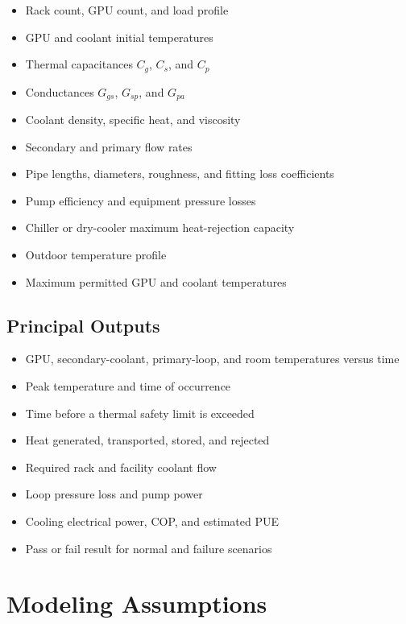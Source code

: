 \documentclass[11pt]{article}
\begin{document}
\begin{itemize}[leftmargin=2em]
    \item Rack count, GPU count, and load profile
    \item GPU and coolant initial temperatures
    \item Thermal capacitances \(C_g\), \(C_s\), and \(C_p\)
    \item Conductances \(G_{gs}\), \(G_{sp}\), and \(G_{pa}\)
    \item Coolant density, specific heat, and viscosity
    \item Secondary and primary flow rates
    \item Pipe lengths, diameters, roughness, and fitting loss coefficients
    \item Pump efficiency and equipment pressure losses
    \item Chiller or dry-cooler maximum heat-rejection capacity
    \item Outdoor temperature profile
    \item Maximum permitted GPU and coolant temperatures
\end{itemize}

\subsection{Principal Outputs}

\begin{itemize}[leftmargin=2em]
    \item GPU, secondary-coolant, primary-loop, and room temperatures versus time
    \item Peak temperature and time of occurrence
    \item Time before a thermal safety limit is exceeded
    \item Heat generated, transported, stored, and rejected
    \item Required rack and facility coolant flow
    \item Loop pressure loss and pump power
    \item Cooling electrical power, COP, and estimated PUE
    \item Pass or fail result for normal and failure scenarios
\end{itemize}

\section{Modeling Assumptions}
\end{document}
